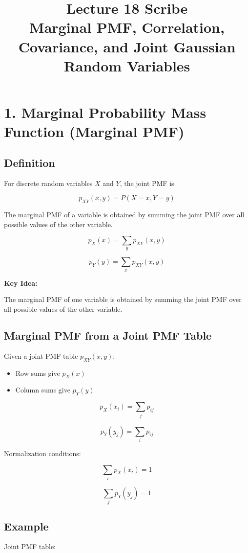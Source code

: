 \documentclass[11pt]{article}
\title{Lecture 18 Scribe \\ \large Marginal PMF, Correlation, Covariance, and Joint Gaussian Random Variables}
\date{}
\author{}
\begin{document}
\maketitle

\section*{1. Marginal Probability Mass Function (Marginal PMF)}

\subsection*{Definition}

For discrete random variables $X$ and $Y$, the joint PMF is

\[
p_{XY}(x,y) = P(X=x, Y=y)
\]

The marginal PMF of a variable is obtained by summing the joint PMF over all possible values of the other variable.

\[
p_X(x) = \sum_y p_{XY}(x,y)
\]

\[
p_Y(y) = \sum_x p_{XY}(x,y)
\]

\textbf{Key Idea:}

The marginal PMF of one variable is obtained by summing the joint PMF over all possible values of the other variable.

\subsection*{Marginal PMF from a Joint PMF Table}

Given a joint PMF table $p_{XY}(x,y)$:

\begin{itemize}
\item Row sums give $p_X(x)$
\item Column sums give $p_Y(y)$
\end{itemize}

\[
p_X(x_i) = \sum_j p_{ij}
\]

\[
p_Y(y_j) = \sum_i p_{ij}
\]

Normalization conditions:

\[
\sum_i p_X(x_i) = 1
\]

\[
\sum_j p_Y(y_j) = 1
\]

\subsection*{Example}

Joint PMF table:
\end{document}

